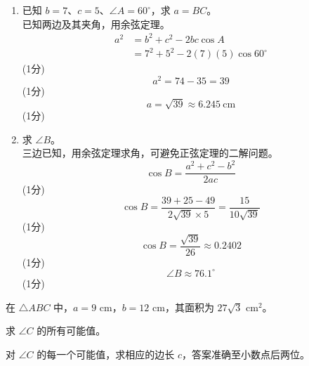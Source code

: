 \documentclass[12pt,a4paper]{exam-zh}
\newcommand{\qscore}[1]{%
    \unskip\nobreak\hfill
    \makebox[0pt][l]{\makebox[4em][r]{(#1\%)}}%
}
\begin{document}
\begin{solution}
    \begin{enumerate}[label=(\alph*)]
        \item 已知 $b = 7$、$c = 5$、$\angle A = 60^\circ$，求 $a = BC$。 \\
        已知两边及其夹角，用余弦定理。 \\
        \begin{align*}
            a^2 &= b^2 + c^2 - 2bc\cos A \\
                &= 7^2 + 5^2 - 2(7)(5)\cos 60^\circ
        \end{align*}
        \hfill (1分) \\
        \[
            a^2 = 74 - 35 = 39
        \]
        \hfill (1分) \\
        \[
            a = \sqrt{39} \approx 6.245 \ \mathrm{cm}
        \]
        \hfill (1分)

        \item 求 $\angle B$。 \\
        三边已知，用余弦定理求角，可避免正弦定理的二解问题。 \\
        \[
            \cos B = \frac{a^2 + c^2 - b^2}{2ac}
        \]
        \hfill (1分) \\
        \[
            \cos B = \frac{39 + 25 - 49}{2\sqrt{39}\times 5} = \frac{15}{10\sqrt{39}}
        \]
        \hfill (1分) \\
        \[
            \cos B = \frac{\sqrt{39}}{26} \approx 0.2402
        \]
        \hfill (1分) \\
        \[
            \angle B \approx 76.1^\circ
        \]
        \hfill (1分)
    \end{enumerate}
\end{solution}

\begin{question}[points = 8]
    在 $\triangle ABC$ 中，$a = 9$ cm，$b = 12$ cm，其面积为 $27\sqrt{3}$ cm$^2$。

    \begin{questionparts}
        \item 求 $\angle C$ 的所有可能值。 \qscore{3}

        \item 对 $\angle C$ 的每一个可能值，求相应的边长 $c$，答案准确至小数点后两位。 \qscore{5}
    \end{questionparts}
\end{question}
\end{document}
